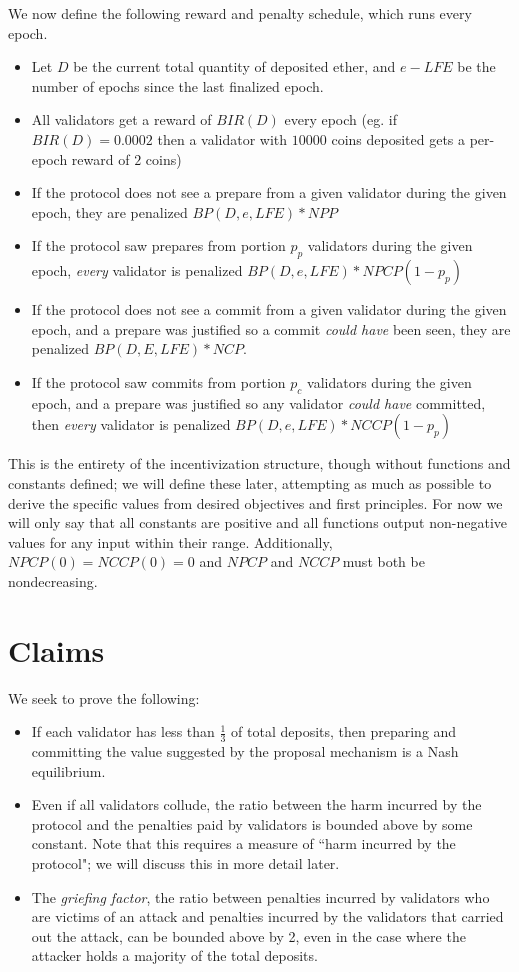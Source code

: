 \documentclass[12pt]{article}
\begin{document}
We now define the following reward and penalty schedule, which runs every epoch.

\begin{itemize}
\item Let $D$ be the current total quantity of deposited ether, and $e - LFE$ be the number of epochs since the last finalized epoch.
\item All validators get a reward of $BIR(D)$ every epoch (eg. if $BIR(D) = 0.0002$ then a validator with $10000$ coins deposited gets a per-epoch reward of $2$ coins)
\item If the protocol does not see a prepare from a given validator during the given epoch, they are penalized $BP(D, e, LFE) * NPP$
\item If the protocol saw prepares from portion $p_p$ validators during the given epoch, \textit{every} validator is penalized $BP(D, e, LFE) * NPCP(1 - p_p)$
\item If the protocol does not see a commit from a given validator during the given epoch, and a prepare was justified so a commit \textit{could have} been seen, they are penalized $BP(D, E, LFE) * NCP$.
\item If the protocol saw commits from portion $p_c$ validators during the given epoch, and a prepare was justified so any validator \textit{could have} committed, then \textit{every} validator is penalized $BP(D, e, LFE) * NCCP(1 - p_p)$
\end{itemize}

This is the entirety of the incentivization structure, though without functions and constants defined; we will define these later, attempting as much as possible to derive the specific values from desired objectives and first principles. For now we will only say that all constants are positive and all functions output non-negative values for any input within their range. Additionally, $NPCP(0) = NCCP(0) = 0$ and $NPCP$ and $NCCP$ must both be nondecreasing.

\section{Claims}

We seek to prove the following:

\begin{itemize}
\item If each validator has less than $\frac{1}{3}$ of total deposits, then preparing and committing the value suggested by the proposal mechanism is a Nash equilibrium.
\item Even if all validators collude, the ratio between the harm incurred by the protocol and the penalties paid by validators is bounded above by some constant. Note that this requires a measure of ``harm incurred by the protocol"; we will discuss this in more detail later.
\item The \textit{griefing factor}, the ratio between penalties incurred by validators who are victims of an attack and penalties incurred by the validators that carried out the attack, can be bounded above by 2, even in the case where the attacker holds a majority of the total deposits.
\end{itemize}
\end{document}
